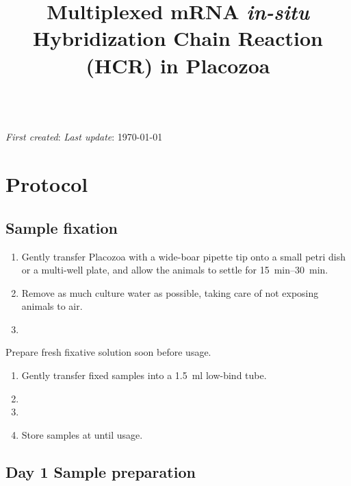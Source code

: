 \documentclass[10pt]{report}
\makeatletter
\renewcommand\maketitle{
{\begin{center}
{\Large \bfseries \@title }\\
{\small \emph{First created}: \DTMdisplaydate{2026}{01}{22}{-1}\hfill%
\setstretch{1.0} \small \hfill \emph{Last update}: \today}
\end{center}}} %
\makeatother
\begin{document}

\title{\vspace{-3em} Multiplexed mRNA \textit{in-situ} Hybridization Chain Reaction (HCR) in Placozoa}
\maketitle
\thispagestyle{plain}

\section*{\vspace{-1em} \textendash{} Protocol \textendash{}}

\subsection*{Sample fixation}

\begin{enumerate}[series = steps]
	\item Gently transfer Placozoa with a wide-boar pipette tip onto a small petri dish or a multi-well plate, and allow the animals to settle for \qtyrange{15}{30}{\minute}.
	\item Remove as much culture water as possible, taking care of not exposing animals to air.
	\item {}
\end{enumerate}

\bigskip\alert{Prepare fresh fixative solution soon before usage.}

\begin{enumerate}[resume = steps]
	\item Gently transfer fixed samples into a \qty{1.5}{\ml} low-bind tube.
	\item {}
	\item {}
	\item Store samples at \minustwenty{} until usage.
\end{enumerate}

\subsection*{Day 1 \textendash{} Sample preparation}
\end{document}

